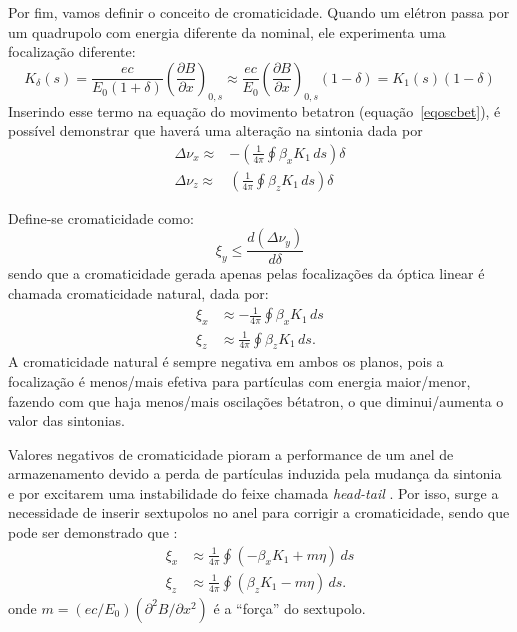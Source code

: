 Por fim, vamos definir o conceito de cromaticidade. Quando um elétron passa por um quadrupolo com energia diferente da nominal, ele experimenta uma focalização diferente:
\begin{equation}
  K_\delta(s)=\frac{ec}{E_0(1+\delta)}\left(\frac{\partial B}{\partial
x}\right)_{0,s} \approx \frac{ec}{E_0}\left(\frac{\partial B}{\partial
x}\right)_{0,s}(1-\delta) = K_1(s)(1 - \delta)
\end{equation}
Inserindo esse termo na equação do movimento betatron \mbox{(equação \ref{eqoscbet})}, é possível demonstrar \cite{Lee, Wiedemann3} que haverá uma alteração na sintonia dada por
\begin{align}
 \Delta \nu_x \approx&-\left(\frac{1}{4\pi}\oint\beta_x K_1\,ds\right)\delta \\
 \Delta \nu_z \approx&\left(\frac{1}{4\pi}\oint\beta_z K_1\,ds\right)\delta
\end{align}

Define-se cromaticidade como:
\begin{equation}\label{eqcromaticidade}
 \xi_y \leq \frac{d (\Delta \nu_y)}{d \delta}
\end{equation}
sendo que a cromaticidade gerada apenas pelas focalizações da óptica linear é chamada cromaticidade natural, dada por:
\begin{align}
 \xi_x &\approx -\frac{1}{4 \pi} \oint \beta_x K_1\, d s  \\
 \xi_z &\approx \frac{1}{4 \pi} \oint \beta_z K_1\, d s.
\end{align}
A cromaticidade natural é sempre negativa em ambos os planos, pois a focalização é menos/mais efetiva para partículas com energia maior/menor, fazendo com que haja menos/mais oscilações bétatron, o que diminui/aumenta o valor das sintonias.

Valores negativos de cromaticidade pioram a performance de um anel de armazenamento devido a perda de partículas induzida pela mudança da sintonia e por excitarem uma instabilidade do feixe chamada \textit{head-tail} \cite{Wiedemann3}. Por isso, surge a necessidade de inserir sextupolos no anel para corrigir a cromaticidade, sendo que pode ser demonstrado que \cite{Wiedemann3}:
\begin{align}
 \xi_x &\approx\frac{1}{4 \pi} \oint(- \beta_x K_1+m\eta)\, d s \\
 \xi_z &\approx\frac{1}{4 \pi} \oint (\beta_z K_1-m\eta)\, d s.
\end{align}
onde $m=(ec/E_0)(\partial^2B/\partial x^2)$ é a ``força'' do sextupolo.

